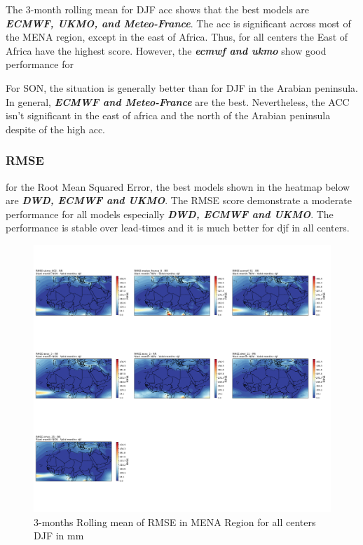 The 3-month rolling mean for DJF acc shows that the best models are \textbf{\textit{ECMWF, UKMO, and Meteo-France}}. The acc is significant across most of the MENA region, except in the east of Africa. Thus, for all centers the East of Africa have the highest score. However, the \textbf{\textit{ecmwf and ukmo}} show good performance for 


 
For SON, the situation is generally better than for DJF in the Arabian peninsula. In general, \textbf{\textit{ECMWF and Meteo-France}} are the best. Nevertheless, the ACC isn't significant in the east of africa and the north of the Arabian peninsula despite of the high acc.


\subsubsection{RMSE}
 
for the Root Mean Squared Error, the best models shown in the heatmap below are \textbf{\textit{DWD, ECMWF and UKMO}}. The RMSE score demonstrate a moderate performance for all models especially \textbf{\textit{DWD, ECMWF and UKMO}}. The performance is stable over lead-times and it is much better for djf in all centers.

\begin{figure}[H]
\centering
\includegraphics[scale=0.3]{plots/det/rmse/rmse_djf_RR.png}
\caption{3-months Rolling mean of RMSE in MENA Region for all centers DJF in mm}
\end{figure}

